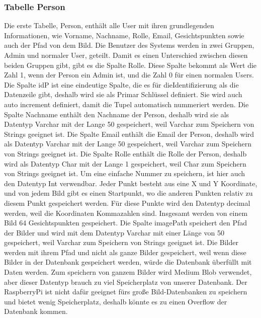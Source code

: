 \subsubsection{Tabelle Person}
Die erste Tabelle, Person, enthält alle User mit ihren grundlegenden Informationen, wie Vorname, Nachname, Rolle, Email, Gesichtspunkten sowie auch der Pfad von dem Bild. Die Benutzer des Systems werden in zwei Gruppen, Admin und normaler User, geteilt. Damit es einen Unterschied zwischen diesen beiden Gruppen gibt, gibt es die Spalte Rolle. Diese Spalte bekommt als Wert die Zahl 1, wenn der Person ein Admin ist, und die Zahl 0 für einen normalen Users.
\bigbreak
Die Spalte idP ist eine eindeutige Spalte, die es für dieIdentifizierung als die Datenzeile gibt, deshalb wird sie als Primar Schlüssel definiert. Sie wird auch auto increment definiert, damit die Tupel automatisch nummeriert werden.
\bigbreak
Die Spalte Nachname enthält den Nachname der Person, deshalb wird sie als Datentyp Varchar mit der Lange 50 gespeichert, weil Varchar zum Speichern von Strings geeignet ist.
\bigbreak
Die Spalte Email enthält die Email der Person, deshalb wird als Datentyp Varchar mit der Lange 50 gespeichert, weil Varchar zum Speichern von Strings geeignet ist.
\bigbreak
Die Spalte Rolle enthält die Rolle der Person, deshalb wird als Datentyp Char mit der Lange 1 gespeichert, weil Char zum Speichern von Strings geeignet ist. Um eine einfache Nummer zu speichern, ist hier auch den Datentyp Int verwendbar.
\bigbreak
Jeder Punkt besteht aus eine X und Y Koordinate, und von jedem Bild gibt es einen Startpunkt, wo die anderen Punkten relativ zu diesem Punkt gespeichert werden. Für diese Punkte wird den Datentyp decimal werden, weil die Koordinaten Kommazahlen sind. Insgesamt werden von einem Bild 64 Gesichtspunkten gespeichert.
\bigbreak
Die Spalte imagePath speichert den Pfad der Bilder und wird mit dem Datentyp Varchar mit einer Länge von 50 gespeichert, weil Varchar zum Speichern von Strings geeignet ist. Die Bilder werden mit ihrem Pfad und nicht als ganze Bilder gespeichert, weil wenn diese Bilder in der Datenbank gespeichert werden, würde die Datenbank überfüllt mit Daten werden. Zum speichern von ganzem Bilder wird Medium Blob verwendet, aber dieser Datentyp brauch zu viel Speicherplatz von unserer Datenbank. Der RaspberryPi ist nicht dafür geeignet fürs große Bild-Datenbanken zu speichern und bietet wenig Speicherplatz, deshalb könnte es zu einen Overflow der Datenbank kommen.

